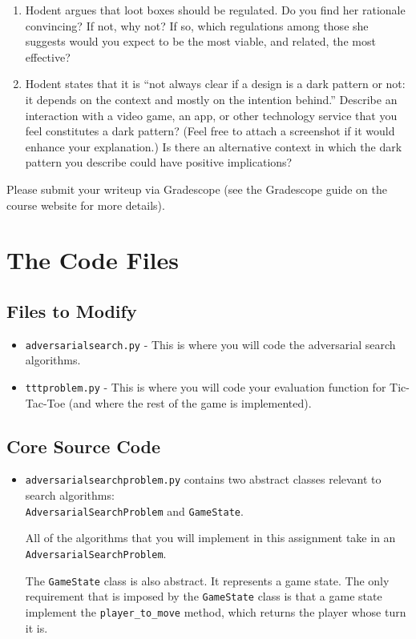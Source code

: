 \documentclass{article}
\begin{document}
\begin{enumerate}
  \item Hodent argues that loot boxes should be regulated. Do you find her rationale convincing? If not, why not? If so, which regulations among those she suggests would you expect to be the most viable, and related, the most effective?

  \item Hodent states that it is ``not always clear if a design is a dark pattern or not: it depends on the context and mostly on the intention behind.'' Describe an interaction with a video game, an app, or other technology service that you feel constitutes a dark pattern? (Feel free to attach a screenshot if it would enhance your explanation.) Is there an alternative context in which the dark pattern you describe could have positive implications?
\end{enumerate}


\noindent
Please submit your writeup via Gradescope (see the Gradescope guide on the course website for more details).

\section{The Code Files}
\subsection{Files to Modify}
\begin{itemize}
  \item \verb|adversarialsearch.py| - This is where you will code the adversarial search algorithms.

  \item \verb|tttproblem.py| - This is where you will code your evaluation function for Tic-Tac-Toe (and where the rest of the game is implemented).
\end{itemize}


\subsection{Core Source Code}
\begin{itemize}
  \item \verb|adversarialsearchproblem.py| contains two abstract classes relevant to search algorithms: \\
    \verb|AdversarialSearchProblem| and \verb|GameState|.

    All of the algorithms that you will implement in this assignment take in an \verb|AdversarialSearchProblem|.

    The \verb|GameState| class is also abstract.
    It represents a game state.
    The only requirement that is imposed by the \verb|GameState| class is that a game state implement the \verb|player_to_move| method, which returns the player whose turn it is.
\end{itemize}
\end{document}
